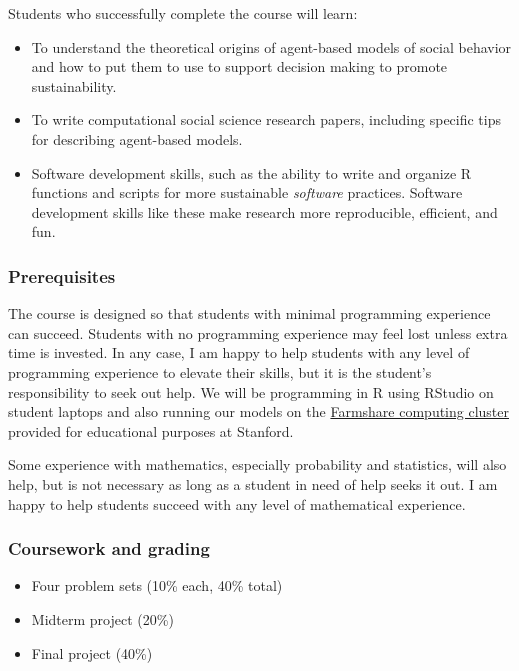 \documentclass[
  letterpaper,
  DIV=11,
  numbers=noendperiod]{scrartcl}
\providecommand{\tightlist}{%
  \setlength{\itemsep}{0pt}\setlength{\parskip}{0pt}}\usepackage{longtable,booktabs,array}
\begin{document}
Students who successfully complete the course will learn:

\begin{itemize}
\tightlist
\item
  To understand the theoretical origins of agent-based models of social
  behavior and how to put them to use to support decision making to
  promote sustainability.
\item
  To write computational social science research papers, including
  specific tips for describing agent-based models.
\item
  Software development skills, such as the ability to write and organize
  R functions and scripts for more sustainable \emph{software}
  practices. Software development skills like these make research more
  reproducible, efficient, and fun.
\end{itemize}

\subsubsection{Prerequisites}\label{prerequisites}

The course is designed so that students with minimal programming
experience can succeed. Students with no programming experience may feel
lost unless extra time is invested. In any case, I am happy to help
students with any level of programming experience to elevate their
skills, but it is the student's responsibility to seek out help. We will
be programming in R using RStudio on student laptops and also running
our models on the \href{https://srcc.stanford.edu/farmshare}{Farmshare
computing cluster} provided for educational purposes at Stanford.

Some experience with mathematics, especially probability and statistics,
will also help, but is not necessary as long as a student in need of
help seeks it out. I am happy to help students succeed with any level of
mathematical experience.

\subsubsection{Coursework and grading}\label{coursework-and-grading}

\begin{itemize}
\tightlist
\item
  Four problem sets (10\% each, 40\% total)
\item
  Midterm project (20\%)
\item
  Final project (40\%)
\end{itemize}
\end{document}
